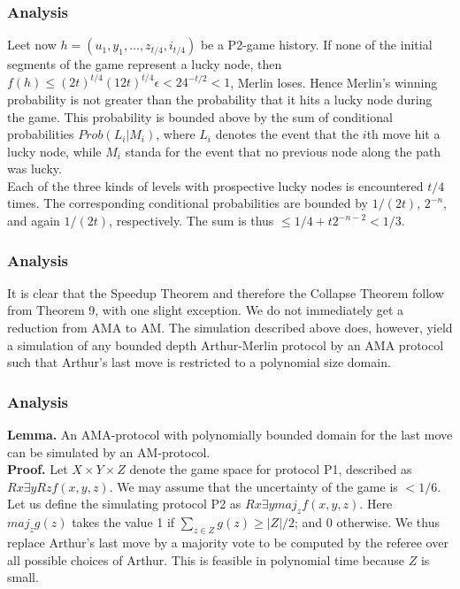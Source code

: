 \documentclass{beamer}
\begin{document}
\begin{frame}
\frametitle{Analysis}
Leet now $h = (u_1, y_1,\ldots, z_{t/4}, i_{t/4})$ be a P2-game history. If none of the initial segments of the game represent a lucky node, then $f(h) \leq (2t)^{t/4} (12t)^{t/4} \epsilon < 24^{-t/2} < 1$, Merlin loses. Hence Merlin's winning probability is not greater than the probability that it hits a lucky node during the game. This probability is bounded above by the sum of conditional probabilities $Prob(L_i|M_i)$, where $L_i$ denotes the event that the $i$th move hit a lucky node, while $M_i$ standa for the event that no previous node along the path was lucky.\\
Each of the three kinds of levels with prospective lucky nodes is encountered $t/4$ times. The corresponding conditional probabilities are bounded by $1/(2t)$, $2^{-n}$, and again $1/(2t)$, respectively. The sum is thus $\leq 1/4 + t2^{-n-2} < 1/3$.
\end{frame}

\begin{frame}
\frametitle{Analysis}
It is clear that the Speedup Theorem and therefore the Collapse Theorem follow from Theorem 9, with one slight exception. We do not immediately get a reduction from AMA to AM. The simulation described above does, however, yield a simulation of any bounded depth Arthur-Merlin protocol by an AMA protocol such that Arthur's last move is restricted to a polynomial size domain.\\
\end{frame}

\begin{frame}
\frametitle{Analysis}
\textbf{Lemma.} An AMA-protocol with polynomially bounded domain for the last move can be simulated by an AM-protocol.\\
\textbf{Proof.} Let $X \times Y \times Z$ denote the game space for protocol P1, described as $R x \exists y R z f(x, y, z)$. We may assume that the uncertainty of the game is $< 1/6$. Let us define the simulating protocol P2 as $R x \exists y maj_z f(x, y, z)$. Here $maj_z g(z)$ takes the value 1 if $\sum_{z \in Z} g(z) \geq |Z|/2$; and 0 otherwise. We thus replace Arthur's last move by a majority vote to be computed by the referee over all possible choices of Arthur. This is feasible in polynomial time because $Z$ is small.
\end{frame}
\end{document}
